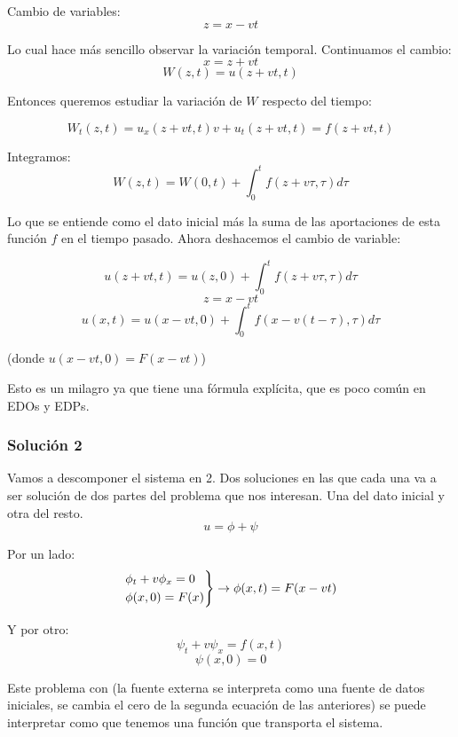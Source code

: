 			Cambio de variables:
			$$z = x-vt$$

			Lo cual hace más sencillo observar la variación temporal. Continuamos el cambio:
			$$x = z + vt$$
			$$W(z,t) = u(z+vt, t)$$

			Entonces queremos estudiar la variación de $W$ respecto del tiempo:

			$$W_t(z,t) = u_x(z + vt, t)v + u_t(z+vt, t) = f(z + vt, t)$$

			Integramos:
			$$W(z,t) = W(0,t) + \int^{t}_{0} f(z+v\tau, \tau) d\tau $$

			Lo que se entiende como el dato inicial más la suma de las aportaciones de esta función $f$ en el tiempo pasado. Ahora deshacemos el cambio de variable:

			$$u(z + vt, t) = u(z,0) + \int^{t}_{0} f(z+v\tau, \tau) d\tau$$
			$$z = x-vt$$
			$$u(x,t) = u(x-vt,0)+ \int^{t}_{0} f(x-v(t-\tau),\tau) d\tau$$

			(donde $u(x-vt,0) = F(x-vt)$)

			Esto es un milagro ya que tiene una fórmula explícita, que es poco común en EDOs y EDPs.

		\subsubsection{Solución 2}

			Vamos a descomponer el sistema en 2. Dos soluciones en las que cada una va a ser solución de dos partes del problema que nos interesan. Una del dato inicial y otra del resto.
			$$u = \phi + \psi$$

			Por un lado:
			$$
			\begin{rcases}
				\phi_t + v\phi_x = 0 \\
				\phi(x,0) = F(x)
			\end{rcases}
			\rightarrow \phi(x,t) = F(x-vt)
			$$

			Y por otro:
			$$\psi_t + v\psi_x = f(x,t)$$
			$$\psi(x,0) = 0$$

			Este problema con  (la fuente externa se interpreta como una fuente de datos iniciales, se cambia el cero de la segunda ecuación de las anteriores) se puede interpretar como que tenemos una función que transporta el sistema.

			\begin{figure}[hbtp]
				\centering
				\caption{}
				\label{fig:interseccionCaracteristica}
			\end{figure}



